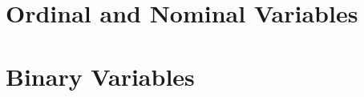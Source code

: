 \documentclass[12pt,a4paper,oneside]{report}
\begin{document}
\section{Ordinal and Nominal Variables}




\section{Binary Variables}

\end{document}
